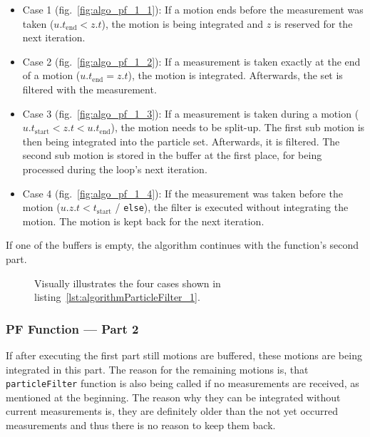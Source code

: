 \begin{itemize}
\item{Case 1} (fig.\ \ref{fig:algo_pf_1_1}): If a motion ends before the measurement was taken ($u.{t_\text{end}} < z.t$), the motion is being integrated and $z$ is reserved for the next iteration.

\item{Case 2} (fig.\ \ref{fig:algo_pf_1_2}): If a measurement is taken exactly at the end of a motion ($u.{t_\text{end}} = z.t$), the motion is integrated. Afterwards, the set is filtered with the measurement.

\item{Case 3} (fig.\ \ref{fig:algo_pf_1_3}): If a measurement is taken during a motion ($u.{t_\text{start}} < z.t < u.{t_\text{end}}$), the motion needs to be split-up. The first sub motion is then being integrated into the particle set. Afterwards, it is filtered. The second sub motion is stored in the buffer at the first place, for being processed during the loop's next iteration.

\item{Case 4} (fig.\ \ref{fig:algo_pf_1_4}): If the measurement was taken before the motion ($u.{z.t < t_\text{start}}$ / \texttt{else}), the filter is executed without integrating the motion. The motion is kept back for the next iteration.

\end{itemize}

\noindent If one of the buffers is empty, the algorithm continues with the function's second part.



\begin{figure}
	
	\caption{Visually illustrates the four cases shown in listing~\ref{lst:algorithmParticleFilter_1}.}
	\label{fig:algo_pf_1}
\end{figure}


\subsubsection*{\acl{PF} Function --- Part 2}
If after executing the first part still motions are buffered, these motions are being integrated in this part. The reason for the remaining motions is, that \texttt{particleFilter} function is also being called if no measurements are received, as mentioned at the beginning. The reason why they can be integrated without current measurements is, they are definitely older than the not yet occurred measurements and thus there is no reason to keep them back.

